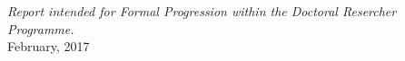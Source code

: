 \begin{titlepage}
\begin{center}
    \vspace{5cm}
    {\em\large Report intended for Formal Progression within the Doctoral Resercher Programme.}\\ \vspace{0.1cm}
      \vspace{1cm}
    {\Large February, 2017}\\
    \vspace{0.5cm}
  \end{center}
\end{titlepage}
\cleardoublepage                    %